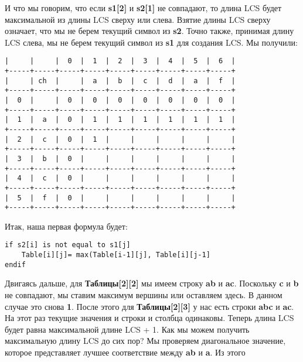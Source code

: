 И что мы говорим, что если \textbf{s1[2]} и \textbf{s2[1]} не совпадают, то длина LCS будет
максимальной из длины LCS сверху или слева. Взятие длины LCS сверху означает, что мы не берем
текущий символ из \textbf{s2}. Точно также, принимая длину LCS слева, мы не берем
текущий символ из \textbf{s1} для создания LCS. Мы получили:
\vspace{\baselineskip}
\begin{tcolorbox}
\begin{verbatim}
|     |     |  0  |  1  |  2  |  3  |  4  |  5  |  6  |
+-----+-----+-----+-----+-----+-----+-----+-----+-----+
|     | ch  |     |  a  |  b  |  c  |  d  |  a  |  f  |
+-----+-----+-----+-----+-----+-----+-----+-----+-----+
|  0  |     |  0  |  0  |  0  |  0  |  0  |  0  |  0  |
+-----+-----+-----+-----+-----+-----+-----+-----+-----+
|  1  |  a  |  0  |  1  |  1  |  1  |  1  |  1  |  1  |
+-----+-----+-----+-----+-----+-----+-----+-----+-----+
|  2  |  c  |  0  |  1  |     |     |     |     |     |
+-----+-----+-----+-----+-----+-----+-----+-----+-----+
|  3  |  b  |  0  |     |     |     |     |     |     |
+-----+-----+-----+-----+-----+-----+-----+-----+-----+
|  4  |  c  |  0  |     |     |     |     |     |     |
+-----+-----+-----+-----+-----+-----+-----+-----+-----+
|  5  |  f  |  0  |     |     |     |     |     |     |
+-----+-----+-----+-----+-----+-----+-----+-----+-----+
\end{verbatim}
\end{tcolorbox}
\vspace{\baselineskip}
Итак, наша первая формула будет:
\vspace{\baselineskip}
\begin{tcolorbox}
\begin{verbatim}     
if s2[i] is not equal to s1[j]
    Table[i][j]= max(Table[i-1][j], Table[i][j-1]
endif
\end{verbatim}
\end{tcolorbox}
\vspace{\baselineskip}
Двигаясь дальше, для \textbf{Таблицы[2][2]} мы имеем строку \textbf{ab} и \textbf{ac}. Поскольку \textbf{c} и
\textbf{b} не совпадают, мы ставим максимум вершины или оставляем здесь. В
данном случае это снова \textbf{1}. После этого для \textbf{Таблицы[2][3]} у нас есть строки
\textbf{abc} и \textbf{ac}. На этот раз текущие значения и строки и столбца одинаковы. Теперь
длина LCS будет равна максимальной длине LCS + 1. Как мы можем получить
максимальную длину LCS до сих пор? Мы проверяем диагональное
значение, которое представляет лучшее соответствие между \textbf{ab} и \textbf{a}. Из этого
